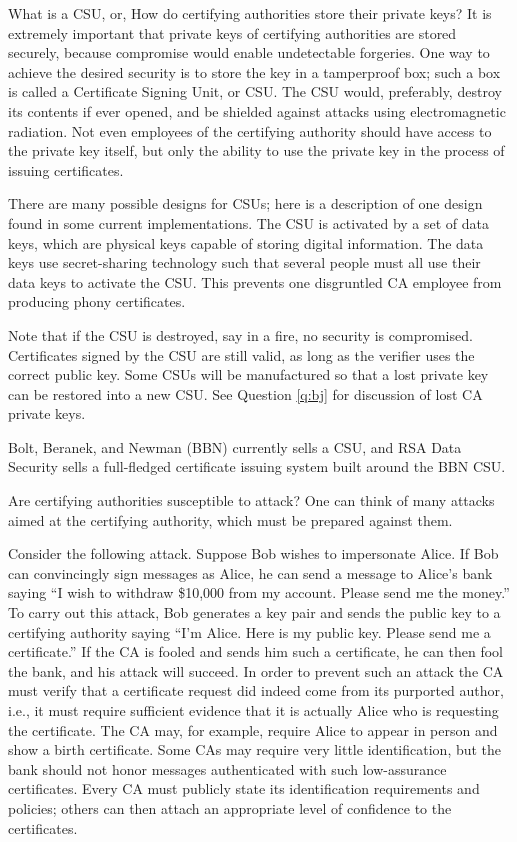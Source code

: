 {What is a CSU, or, How do certifying authorities store their private keys?}
It is extremely important that private keys of certifying authorities are 
stored securely, because compromise would enable undetectable forgeries. 
One way to achieve the desired security is to store the key in a tamperproof
box; such a box is called a Certificate Signing Unit, or CSU. The CSU would, 
preferably, destroy its contents if ever opened, and be shielded against 
attacks using electromagnetic radiation. Not even employees of the certifying 
authority should have access to the private key itself, but only the ability 
to use the private key in the process of issuing certificates. 

There are many possible designs for CSUs; here is a description of one design
found in some current implementations. The CSU is activated by a set of data 
keys, which are physical keys capable of storing digital information. The 
data keys use secret-sharing technology such that several people must all 
use their data keys to activate the CSU. This prevents one disgruntled CA 
employee from producing phony certificates. 

Note that if the CSU is destroyed, say in a fire, no security is compromised.
Certificates signed by the CSU are still valid, as long as the verifier uses 
the correct public key. Some CSUs will be manufactured so that a lost private 
key can be restored into a new CSU. See Question \ref{q:bj} for discussion of 
lost CA private keys.

Bolt, Beranek, and Newman (BBN) currently sells a CSU, and RSA Data Security
sells a full-fledged certificate issuing system built around the BBN CSU.

{Are certifying authorities susceptible to attack?}
One can think of many attacks aimed at the certifying authority, which must
be prepared against them.

Consider the following attack. Suppose Bob wishes to impersonate Alice. 
If Bob can convincingly sign messages as Alice, he can send a message to 
Alice's bank saying ``I wish to withdraw \$10,000 from my account. Please 
send me the money.'' To carry out this attack, Bob generates a key pair and 
sends the public key to a certifying authority saying ``I'm Alice. Here is 
my public key. Please send me a certificate.'' If the CA is fooled and sends 
him such a certificate, he can then fool the bank, and his attack will 
succeed. In order to prevent such an attack the CA must verify that a 
certificate request did indeed come from its purported author, i.e., it must 
require sufficient evidence that it is actually Alice who is requesting the 
certificate. The CA may, for example, require Alice to appear in person and 
show a birth certificate. Some CAs may require very little identification, 
but the bank should not honor messages authenticated with such low-assurance 
certificates. Every CA must publicly state its identification requirements 
and policies; others can then attach an appropriate level of confidence to 
the certificates.

